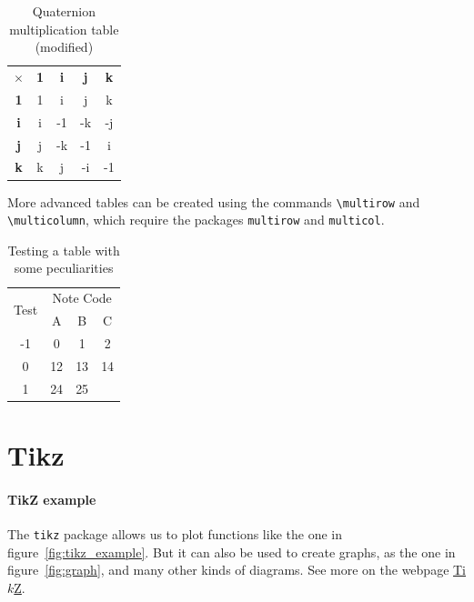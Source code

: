 \documentclass[10pt]{article}
\begin{document}
\begin{table}[h]
    \centering
    \begin{tabular}{c|cc|c|c}
        \hline
         $\times$ & \textbf{1} & \textbf{i} & \textbf{j} & \textbf{k} \\

        \textbf{1} & 1 & i & j & k \\
        \hline
        \textbf{i} & i & -1 & -k & -j \\
        \hline
        \textbf{j} & j & -k & -1 & i \\

        \textbf{k} & k & j & -i & -1 \\
        \hline
    \end{tabular}
    \caption{Quaternion multiplication table (modified)}
    \label{tab:quaternions_modified}
\end{table}


More advanced tables can be created using the commands \verb|\multirow| and \verb|\multicolumn|, which require the packages \verb|multirow| and \verb|multicol|.

\begin{table}[h!]
    \centering
    \begin{tabular}{ |c|c|c|c| }
    	\hline
    	\multirow{2}{*}{Test} & \multicolumn{3}{c|}{Note Code} \\
    	\cline{2-4}
    	& A & B & C \\
    	\hline
    	-1 & 0 & 1 & 2 \\
    	\hline
    	0 & 12 & 13 & 14 \\
    	\hline
    	1 & 24 & 25 \\
        \cline{0-2}
    \end{tabular}
    \caption{Testing a table with some peculiarities}
    \label{tab:table_multi} %
\end{table}



\section{Tikz}
\label{sec:tikz}

\paragraph*{TikZ example} The \verb|tikz| package allows us to plot functions like the one in figure~\ref{fig:tikz_example}. But it can also be used to create graphs, as the one in figure~\ref{fig:graph}, and many other kinds of diagrams. See more on the webpage \href{https://tikz.dev/}{Ti$k$Z}.
\end{document}

